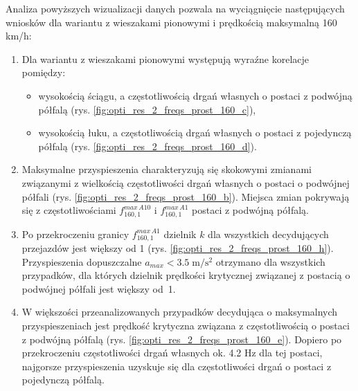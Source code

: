 Analiza powyższych wizualizacji danych pozwala na wyciągnięcie następujących wniosków dla wariantu z wieszakami pionowymi i prędkością maksymalną 160 km/h:
\begin{enumerate}
	
	\item Dla wariantu z wieszakami pionowymi występują wyraźne korelacje pomiędzy:
	\begin{itemize}
		\item wysokością ściągu, a częstotliwością drgań własnych o postaci z podwójną półfalą (rys. \ref{fig:opti_res_2_freqs_prost_160_c}),
		\item wysokością łuku, a częstotliwością drgań własnych o postaci z pojedynczą półfalą (rys. \ref{fig:opti_res_2_freqs_prost_160_d}).
	\end{itemize}
	\item Maksymalne przyspieszenia charakteryzują się skokowymi zmianami związanymi z wielkością częstotliwości drgań własnych o postaci o podwójnej półfali (rys. \ref{fig:opti_res_2_freqs_prost_160_b}). Miejsca zmian pokrywają się z częstotliwościami $f_{160,1}^{max\,A10}$ i $f_{160,1}^{max\,A1}$ postaci z podwójną półfalą. 
	\item Po przekroczeniu granicy $f_{160,1}^{max\,A1}$  dzielnik $k$ dla wszystkich decydujących przejazdów jest większy od 1 (rys. \ref{fig:opti_res_2_freqs_prost_160_h}). Przyspieszenia dopuszczalne ${a_{max}<3.5\;\mathrm{m/s^2}}$ otrzymano dla wszystkich przypadków, dla których dzielnik prędkości krytycznej związanej z postacią o podwójnej półfali jest większy od~1. 
	
	\item W większości przeanalizowanych przypadków decydująca o maksymalnych przyspieszeniach jest prędkość krytyczna związana z częstotliwością o postaci z podwójną półfalą (rys. \ref{fig:opti_res_2_freqs_prost_160_e}). Dopiero po przekroczeniu częstotliwości drgań własnych ok. 4.2 Hz dla tej postaci, najgorsze przyspieszenia uzyskuje się dla częstotliwości drgań o postaci z pojedynczą półfalą.

\end{enumerate}



